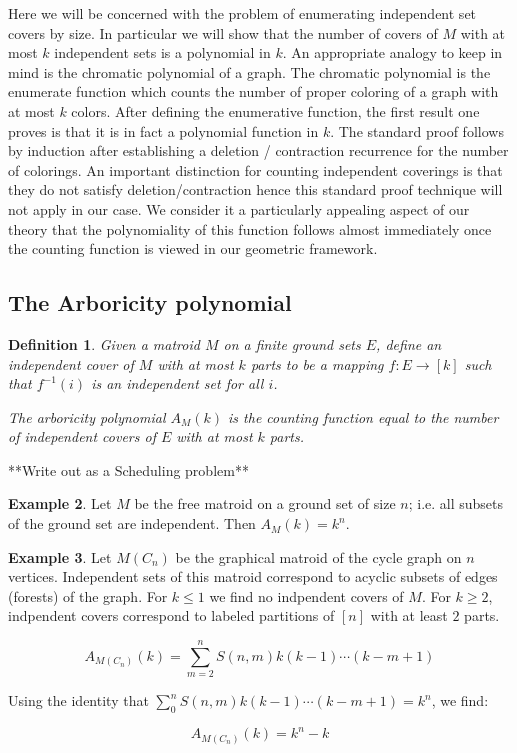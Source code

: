 \documentclass[12pt,reqno]{amsart}
\newtheorem{definition}{Definition}
\numberwithin{definition}{section}
\theoremstyle{definition}
\newtheorem{example}[definition]{Example}
\begin{document}
Here we will be concerned with the problem of enumerating independent
set covers by size.  In particular we will show that the number of
covers of $M$ with at most $k$ independent sets is a polynomial in
$k$.  An appropriate analogy to keep in mind is the chromatic
polynomial of a graph.  The chromatic polynomial is the enumerate
function which counts the number of proper coloring of a graph with at
most $k$ colors.  After defining the enumerative function, the first
result one proves is that it is in fact a polynomial function in $k$.
The standard proof follows by induction after establishing a deletion
/ contraction recurrence for the number of colorings.  An important
distinction for counting independent coverings is that they do not
satisfy deletion/contraction hence this standard proof technique will
not apply in our case.  We consider it a particularly appealing aspect
of our theory that the polynomiality of this function follows almost
immediately once the counting function is viewed in our geometric
framework.

\subsection{The Arboricity polynomial}

\begin{definition} Given a matroid $M$ on a finite ground sets $E$, define an independent cover of $M$ with at most $k$ parts to be a mapping $f : E \rightarrow [k]$ such that $f^{-1}(i)$ is an independent set for all $i$.  

  The arboricity polynomial $A_M(k)$ is the counting function equal to the number of independent covers of $E$ with at most $k$ parts.
\end{definition}

**Write out as a  Scheduling problem**

\begin{example}

Let $M$ be the free matroid on a ground set of size $n$; i.e. all subsets of the ground set are independent.  Then $A_M(k) = k^n$.  

\end{example}

\begin{example}

Let $M(C_n)$ be the graphical matroid of the cycle graph on $n$
vertices.  Independent sets of this matroid correspond to acyclic
subsets of edges (forests) of the graph.  For $k \leq 1$ we find no
indpendent covers of $M$.  For $k \geq 2$, indpendent covers
correspond to labeled partitions of $[n]$ with at least $2$ parts.

$$A_{M(C_n)}(k) = \sum_{m=2}^{n} S(n,m) k(k-1) \cdots (k-m+1) $$

Using the identity that $\sum_0^n S(n,m) k(k-1) \cdots (k-m+1) = k^n$, we find:

$$A_{M(C_n)}(k) = k^n - k $$

\end{example}
\end{document}
